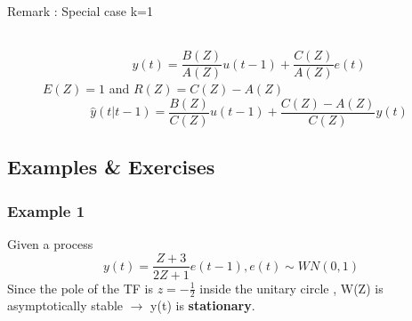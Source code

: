 \begin{description}
\item[Remark : Special case k=1]\hfill\\
$$ y(t) = \frac{B(Z)}{A(Z)}u(t-1)+\frac{C(Z)}{A(Z)}e(t)$$
$E(Z) =1 $ and $ R(Z)= C(Z)-A(Z)$
$$ \hat{y}(t|t-1)= \frac{B(Z)}{C(Z)}u(t-1) + \frac{C(Z)-A(Z)}{C(Z)}y(t)$$

\end{description}

\subsection{Examples \& Exercises}

\subsubsection{Example 1}
Given a process $$ y(t)= \frac{Z+3}{2Z+1} e(t-1) , e(t) \sim WN(0,1)$$
Since the pole of the TF is $z=-\frac{1}{2}$ inside the unitary circle ,  W(Z) is asymptotically stable $\to$ y(t) is \textbf{stationary}.\\
